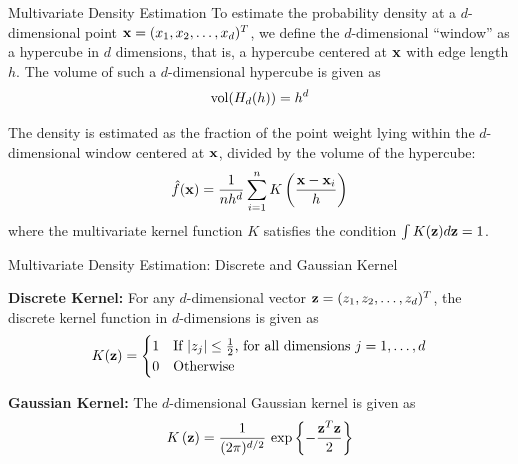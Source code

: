 \begin{frame}{Multivariate Density Estimation}
To estimate the probability density at a $d$-dimensional point $\mathbf{x} =
(x_{1}, x_{2},\ldots, x_{d})^T$, we def\/{i}ne the $d$-dimensional ``window'' as a
hypercube in $d$ dimensions, that is, a \hbox{hypercube}
centered at $\mathbf{x}$ with edge length $h$.
The volume of such a $d$-dimensional hypercube is given as
\begin{align*}
  \vol(H_d(h)) = h^d
\end{align*}

\medskip
The density is estimated as the fraction of the point weight
lying within the
$d$-dimensional window centered at $\mathbf{x}$, divided by the volume of the
hypercube:
\begin{align*}
  \kern3pt\hat{\kern-3pt f}(\mathbf{x}) = \frac{1}{n h^d} \sum_{i=1}^n
  K\left(\frac{\mathbf{x}-\mathbf{x}_i}{h}\right)
\end{align*}
where the multivariate kernel function $K$ satisf\/{i}es the condition
$\int K(\mathbf{z}) d\mathbf{z} = 1$.
\end{frame}


\begin{frame}{Multivariate Density Estimation: Discrete and Gaussian
  Kernel}

{\bf Discrete Kernel:}
For any $d$-dimensional vector $\mathbf{z} = (z_1,z_2, \ldots, z_d)^T$,
the discrete kernel function in $d$-dimensions is given as
\begin{align*}
  K(\mathbf{z}) = \begin{cases}
    1 & \mbox{If $|z_{j}| \leq \frac{1}{2}$, for all dimensions
    $j=1, \ldots, d$}\\
    0 & \mbox{Otherwise}
  \end{cases}
\end{align*}

\medskip
{\bf Gaussian Kernel:}
The $d$-dimensional Gaussian kernel is
given as
\begin{align*}
  K\left(\mathbf{z}\right) =
  \frac{1}{(2\pi)^{d/2}}\,\exp\left\{-\frac{\mathbf{z}^T\mathbf{z}}{2}\right\}
\end{align*}
\end{frame}


